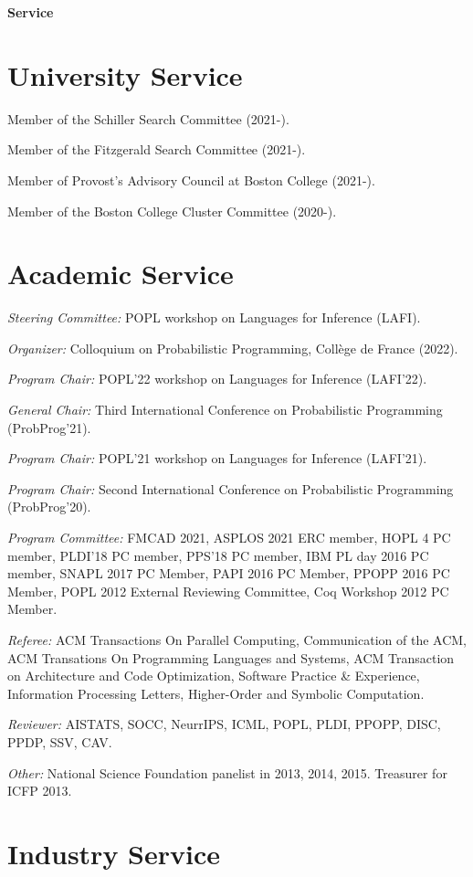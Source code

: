 \documentclass[margin,line]{res}
\begin{document}
\begin{resume}
\newpage
  {\bf {\Large Service}}

\section{\sc University Service}

Member of the Schiller Search Committee (2021-).

Member of the Fitzgerald Search Committee (2021-).

Member of Provost's Advisory Council at Boston College (2021-).

Member of the Boston College Cluster Committee (2020-).

\section{\sc Academic Service}

{\em Steering Committee:} POPL workshop on Languages for Inference (LAFI).

{\em Organizer:} Colloquium on Probabilistic Programming, Coll\`ege de France (2022).

{\em Program Chair:} POPL'22 workshop on Languages for Inference (LAFI'22).

{\em General Chair:} Third International Conference on Probabilistic Programming (ProbProg'21).

{\em Program Chair:} POPL'21 workshop on Languages for Inference (LAFI'21).

{\em Program Chair:} Second International Conference on Probabilistic Programming (ProbProg'20).

{\em Program Committee:} FMCAD 2021, ASPLOS 2021 ERC member, HOPL 4 PC member,
PLDI'18 PC member, PPS'18 PC member, IBM PL day 2016 PC member, SNAPL
2017 PC Member, PAPI 2016 PC Member, PPOPP 2016 PC Member, POPL 2012
External Reviewing Committee, Coq Workshop 2012 PC Member.

{\em Referee:} ACM Transactions On Parallel Computing, Communication of the ACM, ACM Transations On Programming Languages and Systems, ACM Transaction on Architecture and Code Optimization, 
Software Practice \& Experience, Information Processing Letters, Higher-Order and Symbolic Computation.

{\em Reviewer:} AISTATS, SOCC, NeurrIPS, ICML, POPL, PLDI, PPOPP, DISC, PPDP, SSV,
CAV.

{\em Other:} National Science Foundation panelist in 2013, 2014, 2015. Treasurer for ICFP 2013.

\section{\sc Industry Service}


\end{resume}
\end{document}
